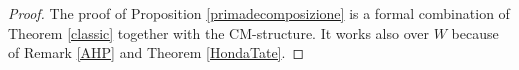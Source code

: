 

\begin{proof}
The proof of Proposition \ref{primadecomposizione}    is a formal combination of Theorem \ref{classic} together with   the CM-structure.
It works also over $W$ because of Remark \ref{AHP} and Theorem \ref{HondaTate}.
\end{proof}
